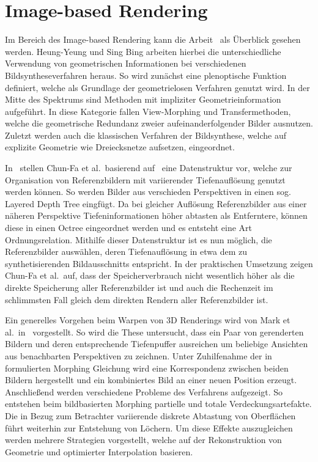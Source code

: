 \documentclass[hyperref, beleg, german, final, twoside]{cgvpub}
\begin{document}
\section{Image-based Rendering}

Im Bereich des Image-based Rendering kann die Arbeit~\cite{shum2000review} als
Überblick gesehen werden. Heung-Yeung und Sing Bing arbeiten hierbei die
unterschiedliche Verwendung von geometrischen Informationen bei verschiedenen
Bildsyntheseverfahren heraus. So wird zunächst eine plenoptische Funktion
definiert, welche als Grundlage der geometrielosen Verfahren genutzt wird. In
der Mitte des Spektrums sind Methoden mit impliziter Geometrieinformation
aufgeführt. In diese Kategorie fallen View-Morphing und Transfermethoden,
welche die geometrische Redundanz zweier aufeinanderfolgender Bilder ausnutzen.
Zuletzt werden auch die klassischen Verfahren der Bildsynthese, welche auf
explizite Geometrie wie Dreiecksnetze aufsetzen, eingeordnet.

In~\cite{chang1999ldi} stellen Chun-Fa et al.\ basierend auf~\cite{he1998layered}
eine Datenstruktur vor, welche zur Organisation von Referenzbildern mit
variierender Tiefenauflösung genutzt werden können. So werden Bilder aus
verschieden Perspektiven in einen sog. Layered Depth Tree eingfügt. Da bei
gleicher Auflösung Referenzbilder aus einer näheren Perspektive
Tiefeninformationen höher abtasten als Entferntere, können diese in einen Octree
eingeordnet werden und es entsteht eine Art Ordnungsrelation. Mithilfe dieser
Datenstruktur ist es nun möglich, die Referenzbilder auswählen, deren
Tiefenauflösung in etwa dem zu synthetisierenden Bildausschnitts entspricht. In
der praktischen Umsetzung zeigen Chun-Fa et al.\ auf, dass der Speicherverbrauch
nicht wesentlich höher als die direkte Speicherung aller Referenzbilder ist und
auch die Rechenzeit im schlimmsten Fall gleich dem direkten Rendern aller
Referenzbilder ist.

Ein generelles Vorgehen beim Warpen von 3D Renderings wird von Mark et al.\
in~\cite{mark1997post} vorgestellt. So wird die These untersucht, dass ein Paar
von gerenderten Bildern und deren entsprechende Tiefenpuffer ausreichen um
beliebige Ansichten aus benachbarten Perspektiven zu zeichnen. Unter
Zuhilfenahme der in~\cite{mcmillan1995head} formulierten Morphing Gleichung
wird eine Korrespondenz zwischen beiden Bildern hergestellt und ein
kombiniertes Bild an einer neuen Position erzeugt. Anschließend werden
verschiedene Probleme des Verfahrens aufgezeigt. So entstehen beim
bildbasierten Morphing partielle und totale Verdeckungsartefakte. Die in Bezug
zum Betrachter variierende diskrete Abtastung von Oberflächen führt weiterhin
zur Entstehung von Löchern. Um diese Effekte auszugleichen werden mehrere
Strategien vorgestellt, welche auf der Rekonstruktion von Geometrie und
optimierter Interpolation basieren.
\end{document}
